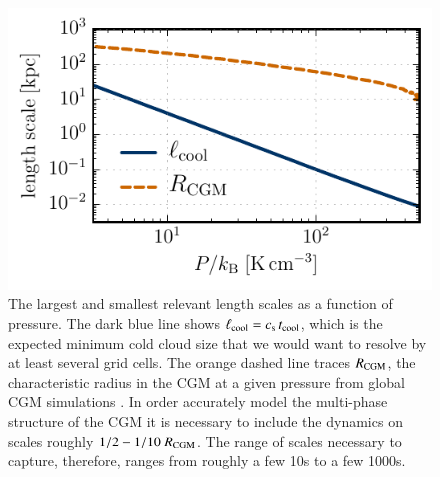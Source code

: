 \documentclass[11pt,letterpaper,english]{article}
\begin{document}
\begin{figure}[h]
    \centering
    \begin{minipage}{0.45\textwidth}
	\caption{ The largest and smallest relevant length scales as a function of pressure. The dark blue line shows $\ell_{\rm cool} = c_{\rm s} \, t_{\rm cool}$, which is the expected minimum cold cloud size \cite{McCourt18} that we would want to resolve by at least several grid cells. The orange dashed line traces $R_{\rm CGM}$, the characteristic radius in the CGM at a given pressure from global CGM simulations \cite{Fielding17}. In order accurately model the multi-phase structure of the CGM it is necessary to include the dynamics on scales roughly $1/2 - 1/10 \ R_{\rm CGM}$. The range of scales necessary to capture, therefore, ranges from roughly a few 10s to a few 1000s. \label{fig:cs_tcool}}
    \end{minipage}\hfill
    \begin{minipage}{0.55\textwidth}
        \hspace{0.3cm} 
        \includegraphics[width=1.1\textwidth]{../figures/length_scales_sim.pdf} 
    \end{minipage}
\end{figure}
\end{document}
